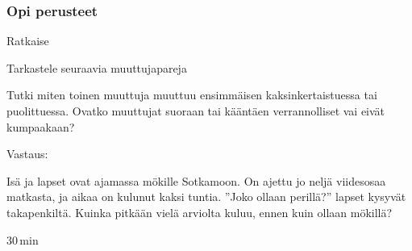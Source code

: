 \begin{tehtavasivu}

\subsubsection*{Opi perusteet}

\begin{tehtava}
Ratkaise
\begin{alakohdatrivi}
\end{alakohdatrivi}
\begin{vastaus}
\begin{alakohdat}
\end{alakohdat}
\end{vastaus}
\end{tehtava}

\begin{tehtava}
    Tarkastele seuraavia muuttujapareja
    \begin{alakohdat}
    \end{alakohdat}
    Tutki miten toinen muuttuja muuttuu ensimmäisen kaksinkertaistuessa tai puolittuessa. Ovatko muuttujat suoraan tai kääntäen verrannolliset vai eivät kumpaakaan?
    \begin{vastaus}
        Vastaus:
        \begin{alakohdat}
        \end{alakohdat}
    \end{vastaus}
\end{tehtava}


\begin{tehtava}
Isä ja lapset ovat ajamassa mökille Sotkamoon. On ajettu jo neljä viidesosaa matkasta, ja aikaa on kulunut kaksi tuntia. ''Joko ollaan perillä?'' lapset kysyvät takapenkiltä. Kuinka pitkään vielä arviolta kuluu, ennen kuin ollaan mökillä?
    \begin{vastaus}
        $30$\,min
    \end{vastaus}
\end{tehtava}



\end{tehtavasivu}

